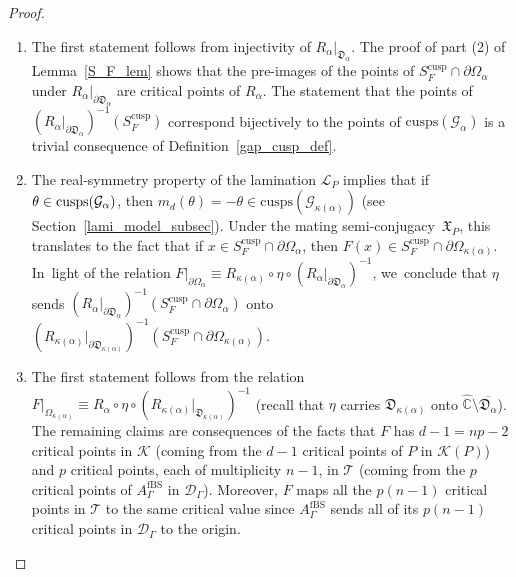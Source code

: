 \documentclass[JEP,XML,SOM,Unicode,NoFloatCountersInSection,published]{cedram}
\theoremstyle{definition}
\theoremstyle{remark}
\newcommand{\C}{\mathbb{C}}
\newcommand{\cT}{\mathcal{T}}
\newcommand{\cK}{\mathcal{K}}
\begin{document}
\skpt
\begin{proof}
\begin{enumerate}
\item
The first statement follows from injectivity of $R_\alpha\vert_{\mathfrak{D}_\alpha}$.
The proof of part (2) of Lemma~\ref{S_F_lem} shows that the pre-images of the points of $S_F^{\mathrm{cusp}}\cap\partial\Omega_\alpha$ under $R_\alpha\vert_{\partial\mathfrak{D}_\alpha}$ are critical points of $R_\alpha$. The statement that the points of $(R_\alpha\vert_{\partial\mathfrak{D}_\alpha})^{-1}(S_F^{\mathrm{cusp}})$ correspond bijectively to the points of $\mathrm{cusps}(\mathcal{G}_\alpha)$ is a trivial consequence of Definition~\ref{gap_cusp_def}.

\item
The real-symmetry property of the lamination $\mathcal{L}_P$ implies that if $\theta\in\nobreak\mathrm{cusps}(\mathcal{G}_\alpha)$, then $m_d(\theta)=-\theta\in\mathrm{cusps}(\mathcal{G}_{\kappa(\alpha)})$ (see Section~\ref{lami_model_subsec}). Under the mating semi-conju\-gacy~$\mathfrak{X}_P$, this translates to the fact that if $x\in S_F^{\mathrm{cusp}}\cap\partial\Omega_\alpha$, then $F(x)\in S_F^{\mathrm{cusp}}\cap\partial\Omega_{\kappa(\alpha)}$. In~light of the relation
$F\vert_{\partial\Omega_\alpha}\equiv R_{\kappa(\alpha)}\circ\eta\circ (R_\alpha\vert_{\partial\mathfrak{D}_\alpha})^{-1}$, we~conclude that $\eta$ sends $(R_\alpha\vert_{\partial\mathfrak{D}_\alpha})^{-1}(S_F^{\mathrm{cusp}}\cap\partial\Omega_\alpha)$ onto $(R_{\kappa(\alpha)}\vert_{\partial\mathfrak{D}_{\kappa(\alpha)}})^{-1}(S_F^{\mathrm{cusp}}\cap\partial\Omega_{\kappa(\alpha)})$.

\item
The first statement follows from the relation $F\vert_{\Omega_{\kappa(\alpha)}}\equiv R_{\alpha}\circ\eta\circ(R_{\kappa(\alpha)}\vert_{\mathfrak{D}_{\kappa(\alpha)}})^{-1}$ (recall that $\eta$ carries $\mathfrak{D}_{\kappa(\alpha)}$ onto $\widehat{\C}\setminus\overline{\mathfrak{D}_\alpha}$). The remaining claims are consequences of the facts that $F$ has $d-1=np-2$ critical points in $\mathcal{K}$ (coming from the $d-1$ critical points of $P$ in $\cK(P)$) and $p$ critical points, each of multiplicity $n-1$, in $\cT$ (coming from the $p$ critical points of $A_{\Gamma}^{\mathrm{fBS}}$ in $\mathcal{D}_{\Gamma}$). Moreover, $F$ maps all the $p(n-1)$ critical points in $\cT$ to the same critical value since $A_{\Gamma}^{\mathrm{fBS}}$ sends all of its $p(n-1)$ critical points in $\mathcal{D}_{\Gamma}$ to the origin.
\qedhere
\end{enumerate}
\end{proof}
\end{document}
